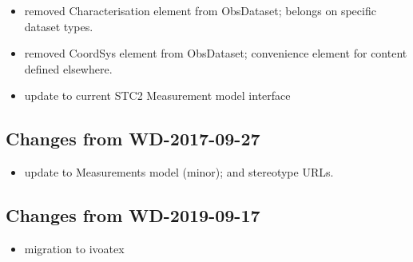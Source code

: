 \begin{itemize} %
  \item removed Characterisation element from ObsDataset; belongs on specific dataset types.
  \item removed CoordSys element from ObsDataset; convenience element for content defined elsewhere.
  \item update to current STC2 Measurement model interface
\end{itemize}

\subsection{Changes from WD-2017-09-27}
\begin{itemize} %
  \item update to Measurements model (minor); and stereotype URLs.
\end{itemize}

\subsection{Changes from WD-2019-09-17}
\begin{itemize} %
  \item migration to ivoatex
\end{itemize}

